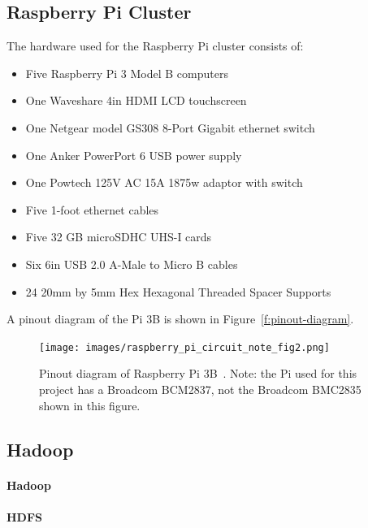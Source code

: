 \subsection{Raspberry Pi Cluster}

The hardware used for the Raspberry Pi cluster consists of:

\begin{itemize}
\item Five Raspberry Pi 3 Model B computers 
\item One Waveshare 4in HDMI LCD touchscreen
\item One Netgear model GS308 8-Port Gigabit ethernet switch
\item One Anker PowerPort 6 USB power supply
\item One Powtech 125V AC 15A 1875w adaptor with switch
\item Five 1-foot ethernet cables
\item Five 32 GB microSDHC UHS-I cards
\item Six 6in USB 2.0 A-Male to Micro B cables
\item 24 20mm by 5mm Hex Hexagonal Threaded Spacer Supports
\end{itemize}

A pinout diagram of the Pi 3B is shown in Figure~\ref{f:pinout-diagram}.

\begin{figure}[!ht]
  \centering\texttt{[image: images/raspberry\_pi\_circuit\_note\_fig2.png]}
  \caption{Pinout diagram of Raspberry Pi 3B~\cite{hid-sp18-419-pi-pinout}. Note: the Pi used for this project has a Broadcom BCM2837, not the Broadcom BMC2835 shown in this figure.}\label{f:pinout-digram}
\end{figure}

\subsection{Hadoop}

\paragraph{Hadoop}
\paragraph{HDFS}
